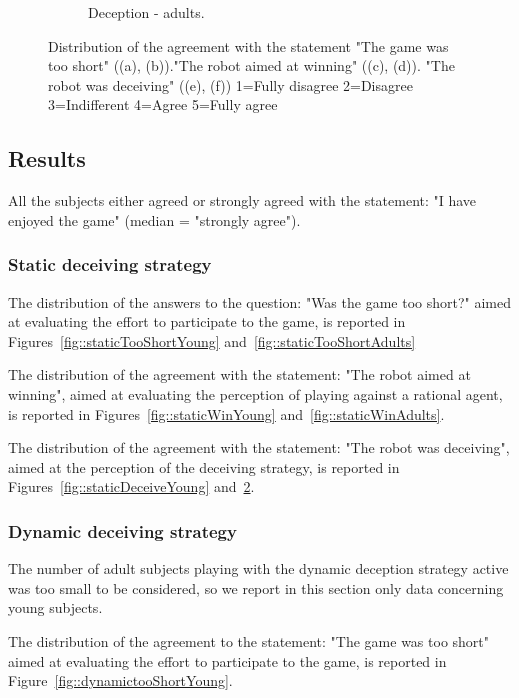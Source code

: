 \begin{figure}[t]
\begin{subfigure}[t]{0.49\columnwidth}
    \caption{Deception - adults.}
    \label{fig::staticDeceiveAdults}
  \end{subfigure}
  \caption{Distribution of the agreement with the statement "The game was too short" ((a), (b))."The robot aimed at winning" ((c), (d)). "The robot was deceiving" ((e), (f))  1=Fully disagree 2=Disagree 3=Indifferent 4=Agree 5=Fully agree}
\end{figure}

\subsection{Results}
All the subjects either agreed or strongly agreed with the statement: "I have enjoyed the game" (median = "strongly agree").

\subsubsection{Static deceiving strategy}
The distribution of the answers to the question: "Was the game too short?" aimed at evaluating the effort to  participate to the game, is reported in Figures~\ref{fig::staticTooShortYoung} and~\ref{fig::staticTooShortAdults}

The distribution of the agreement with the statement: "The robot aimed at winning", aimed at evaluating the perception of playing against a rational agent, is reported in Figures~\ref{fig::staticWinYoung} and~\ref{fig::staticWinAdults}.

The distribution of the agreement with the statement: "The robot was deceiving", aimed at the perception of the deceiving strategy, is reported in Figures~\ref{fig::staticDeceiveYoung} and~\ref{fig::staticDeceiveAdults}.

\subsubsection{Dynamic deceiving strategy}
The number of adult subjects playing with the dynamic deception strategy active was too small to be considered, so we report in this section only data concerning young subjects.

The distribution of the agreement to the statement: "The game was too short" aimed at evaluating the effort to  participate to the game, is reported in Figure~\ref{fig::dynamictooShortYoung}.

